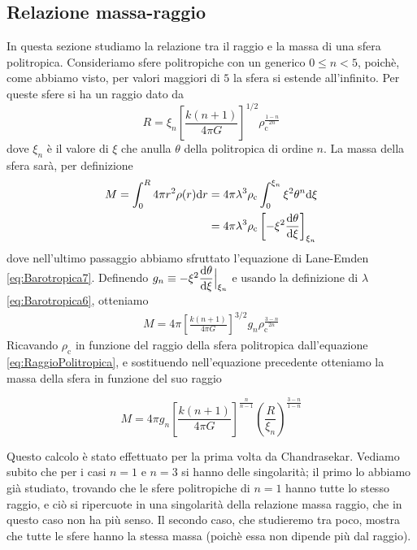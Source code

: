 \subsection{Relazione massa-raggio}
In questa sezione studiamo la relazione tra il raggio e la massa di una sfera politropica. Consideriamo sfere politropiche con un generico $0\leq n < 5$, poichè, come abbiamo visto, per valori maggiori di $5$ la sfera si estende all'infinito. Per queste sfere si ha un raggio dato da
\begin{equation}
R= \xi_n \left[ \frac{k(n+1)}{4\pi G} \right]^{1/2} \rho_\mathrm{c} ^\frac{1-n}{2n} \label{eq:RaggioPolitropica}
\end{equation}
dove $\xi_n$ è il valore di $\xi$ che anulla $\theta$ della politropica di ordine $n$.
La massa della sfera sarà, per definizione
\begin{align*}
M=\int_0^R 4\pi r^2 \rho (r) \mathrm{d} r &= 4 \pi \lambda^3 \rho_\mathrm{c} \int_0 ^{\xi_n} \xi^2 \theta ^n \mathrm{d} \xi \\
& = 4 \pi \lambda^3 \rho_\mathrm{c} \left[ -\xi^2 \dfrac{\mathrm{d} {\theta}}{\mathrm{d} {\xi}} \right]_{\xi_n}
\end{align*}
dove nell'ultimo passaggio abbiamo sfruttato l'equazione di Lane-Emden \ref{eq:Barotropica7}. Definendo $g_n \equiv  -\xi^2 \dfrac{\mathrm{d} {\theta}}{\mathrm{d} {\xi}} \Big|_{\xi_n}$ e usando la definizione di $\lambda$ \ref{eq:Barotropica6}, otteniamo 
\begin{align*}
M = 4\pi \left[ \frac{k(n+1)}{4\pi G} \right]^{3/2} g_n \rho_\mathrm{c}^\frac{3-n}{2n}
\end{align*}
Ricavando $\rho_\mathrm{c}$ in funzione del raggio della sfera politropica dall'equazione \ref{eq:RaggioPolitropica}, e sostituendo nell'equazione precedente otteniamo la massa della sfera in funzione del suo raggio
\begin{EQ}
\begin{equation}
M = 4\pi g_n \left[ \frac{k(n+1)}{4\pi G} \right]^\frac{n}{n-1} \left( \frac{R}{\xi_n} \right)^\frac{3-n}{1-n} \label{eq:MassaRaggio}
\end{equation}
\end{EQ}
Questo calcolo è stato effettuato per la prima volta da Chandrasekar. Vediamo subito che per i casi $n=1$ e $n=3$ si hanno delle singolarità; il primo lo abbiamo già studiato, trovando che le sfere politropiche di $n=1$ hanno tutte lo stesso raggio, e ciò si ripercuote in una singolarità della relazione massa raggio, che in questo caso non ha più senso. Il secondo caso, che studieremo tra poco, mostra che tutte le sfere hanno la stessa massa (poichè essa non dipende più dal raggio).

